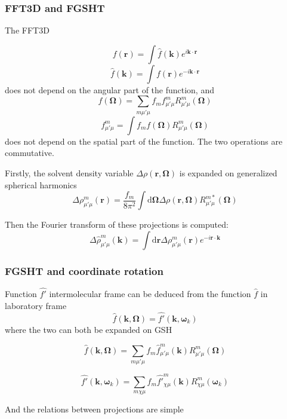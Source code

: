 \subsubsection{FFT3D and FGSHT}

The FFT3D

\[
f(\mathbf{r})=\int\hat{f}(\mathbf{k})e^{i\mathbf{k}\cdot\mathbf{r}}
\]
\[
\hat{f}(\mathbf{k})=\int f(\mathbf{r})e^{-i\mathbf{k}\cdot\mathbf{r}}
\]
does not depend on the angular part of the function, and
\[
f(\mathbf{\Omega})=\sum_{m\mu'\mu}f_{m}f_{\mu'\mu}^{m}R_{\mu'\mu}^{m}(\mathbf{\Omega})
\]
\[
f_{\mu'\mu}^{m}=\int f_{m}f(\mathbf{\Omega})R_{\mu'\mu}^{m}(\mathbf{\Omega})
\]
does not depend on the spatial part of the function. The two operations
are commutative.

Firstly, the solvent density variable $\Delta\rho(\mathbf{r},\mathbf{\Omega})$
is expanded on generalized spherical harmonics
\begin{equation}
\Delta\rho_{\mu'\mu}^{m}(\mathbf{r})=\frac{f_{m}}{8\pi^{2}}\int\mathrm{d}\mathbf{\Omega}\Delta\rho(\mathbf{r},\mathbf{\Omega})R_{\mu'\mu}^{m*}(\mathbf{\Omega})\label{eq:fgsht-fwd-1}
\end{equation}

Then the Fourier transform of these projections is computed:
\begin{equation}
\Delta\hat{\rho}_{\mu'\mu}^{m}(\mathbf{k})=\int\mathrm{d}\mathbf{r}\Delta\rho_{\mu'\mu}^{m}(\mathbf{r})e^{-i\mathbf{r}\cdot\mathbf{k}}\label{eq:fft3d-fwd-1}
\end{equation}


\subsubsection{FGSHT and coordinate rotation}

Function $\hat{f'}$ intermolecular frame can be deduced from the
function $\hat{f}$ in laboratory frame 
\[
\hat{f}(\mathbf{k},\mathbf{\Omega})=\hat{f'}(\mathbf{k},\boldsymbol{\omega}_{k})
\]
where the two can both be expanded on \acs{GSH}

\[
\hat{f}(\mathbf{k},\mathbf{\Omega})=\sum_{m\mu'\mu}f_{m}\hat{f}_{\mu'\mu}^{m}(\mathbf{k})R_{\mu'\mu}^{m}(\mathbf{\Omega})
\]

\[
\hat{f'}(\mathbf{k},\boldsymbol{\omega}_{k})=\sum_{m\chi\mu}f_{m}\hat{f'}_{\chi\mu}^{m}(\mathbf{k})R_{\chi\mu}^{m}(\boldsymbol{\omega}_{k})
\]

And the relations between projections are simple

